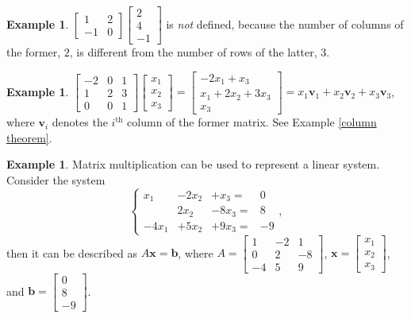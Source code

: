 \documentclass[12pt,letterpaper]{book}
\numberwithin{equation}{section}
\theoremstyle{definition}
\newtheorem{example}[thm]{\textbf{Example}}
\newcommand{\vv}{\bm{v}}
\newcommand{\vx}{\bm{x}}
\newcommand{\vb}{\bm{b}}
\begin{document}
\begin{example}
$\left[\begin{array}{rr} 1 & 2 \\ -1 & 0
\end{array}\right]\left[\begin{array}{r} 2 \\ 4 \\ -1
\end{array}\right]$ is \textit{not} defined, because the number of columns of the former, $2$, is different from the number of rows of the latter, $3$.
\end{example}

\begin{example}
$\left[\begin{array}{rrr} -2 & 0 & 1 \\ 1 & 2 & 3 \\
0 & 0 & 1 \end{array}\right]\left[\begin{array}{r} x_1 \\ x_2 \\
x_3 \end{array}\right]=\left[\begin{array}{c} -2x_1 + x_3 \\ x_1+2x_2+3x_3 \\ x_3
\end{array}\right]=x_1\vv_1+x_2\vv_2+x_3\vv_3$, where $\vv_i$ denotes the $i^{\text{th}}$ column of the former matrix. See Example \ref{column theorem}.
\end{example}

\begin{example}
Matrix multiplication can be used to represent a linear system. Consider the system
$$\left\{\begin{array}{rrrr} x_1&-2x_2&+x_3=&0 \\ &2x_2 &-8x_3=&8 \\ -4x_1&+5x_2&+9x_3=&-9 \end{array}\right.,$$
then it can be described as $A\vx=\vb$, where $A=\left[\begin{array}{rrr}1 & -2 & 1 \\ 0 & 2 & -8
\\ -4 & 5 & 9  \end{array}\right]$, $\vx=\left[\begin{array}{r} x_1 \\ x_2 \\ x_3 \end{array}\right]$, and $\vb=\left[\begin{array}{r} 0 \\ 8 \\ -9 \end{array}\right]$.
\end{example}
\end{document}
